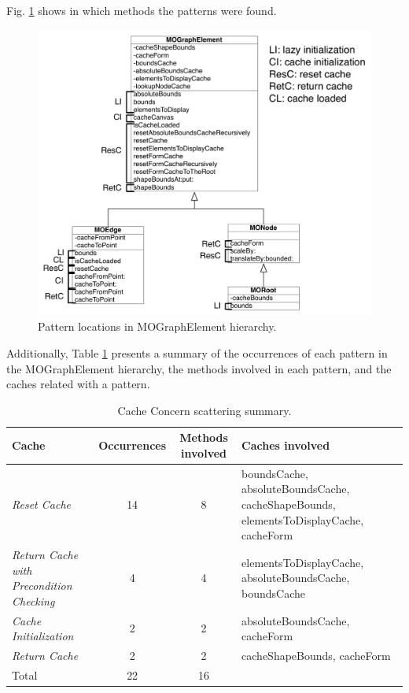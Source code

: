 \documentclass[runningheads]{llncs}
\begin{document}
Fig. \ref{fig:Pattern-locations-in} shows in which methods the
patterns were found.%
\begin{figure}
\begin{centering}
\includegraphics[scale=0.9]{PatternLocation}
\par\end{centering}
\caption{Pattern locations in MOGraphElement hierarchy.\label{fig:Pattern-locations-in}}
\end{figure}

Additionally, Table \ref{tab:Cache-Concern-scattering} presents
a summary of the occurrences of each pattern in the MOGraphElement
hierarchy, the methods involved in each pattern, and the caches related
with a pattern.

%
\begin{table}
\begin{centering}
\begin{tabular}{|p{2.5cm}|c|c|p{3.5cm}|}
\hline 
Cache & Occurrences & Methods involved & Caches involved\tabularnewline
\hline
\hline 
\emph{Reset Cache} & 14 & 8 & boundsCache, absoluteBoundsCache, cacheShapeBounds, elementsToDisplayCache,
cacheForm \tabularnewline
\hline 
\emph{Return Cache with Precondition Checking} & 4 & 4 & elementsToDisplayCache, absoluteBoundsCache, boundsCache \tabularnewline
\hline 
\emph{Cache Initialization} & 2 & 2 & absoluteBoundsCache, cacheForm\tabularnewline
\hline 
\emph{Return Cache} & 2 & 2 & cacheShapeBounds, cacheForm\tabularnewline
\hline 
Total & 22 & 16 & \multicolumn{1}{c}{}\tabularnewline
\cline{1-3} 
\end{tabular}
\par\end{centering}

\caption{Cache Concern scattering summary.\label{tab:Cache-Concern-scattering}}



\end{table}
\end{document}

